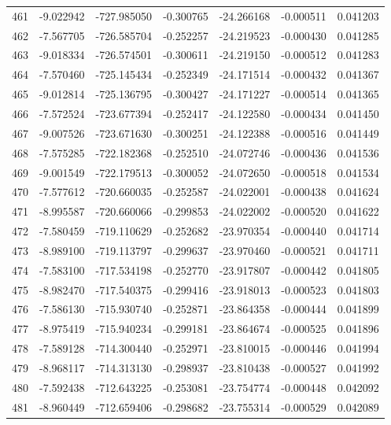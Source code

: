 \begin{tabular}{rrrrrrr}
 461 &  -9.022942 & -727.985050 & -0.300765 &  -24.266168 &   -0.000511 &  0.041203 \\
 462 &  -7.567705 & -726.585704 & -0.252257 &  -24.219523 &   -0.000430 &  0.041285 \\
 463 &  -9.018334 & -726.574501 & -0.300611 &  -24.219150 &   -0.000512 &  0.041283 \\
 464 &  -7.570460 & -725.145434 & -0.252349 &  -24.171514 &   -0.000432 &  0.041367 \\
 465 &  -9.012814 & -725.136795 & -0.300427 &  -24.171227 &   -0.000514 &  0.041365 \\
 466 &  -7.572524 & -723.677394 & -0.252417 &  -24.122580 &   -0.000434 &  0.041450 \\
 467 &  -9.007526 & -723.671630 & -0.300251 &  -24.122388 &   -0.000516 &  0.041449 \\
 468 &  -7.575285 & -722.182368 & -0.252510 &  -24.072746 &   -0.000436 &  0.041536 \\
 469 &  -9.001549 & -722.179513 & -0.300052 &  -24.072650 &   -0.000518 &  0.041534 \\
 470 &  -7.577612 & -720.660035 & -0.252587 &  -24.022001 &   -0.000438 &  0.041624 \\
 471 &  -8.995587 & -720.660066 & -0.299853 &  -24.022002 &   -0.000520 &  0.041622 \\
 472 &  -7.580459 & -719.110629 & -0.252682 &  -23.970354 &   -0.000440 &  0.041714 \\
 473 &  -8.989100 & -719.113797 & -0.299637 &  -23.970460 &   -0.000521 &  0.041711 \\
 474 &  -7.583100 & -717.534198 & -0.252770 &  -23.917807 &   -0.000442 &  0.041805 \\
 475 &  -8.982470 & -717.540375 & -0.299416 &  -23.918013 &   -0.000523 &  0.041803 \\
 476 &  -7.586130 & -715.930740 & -0.252871 &  -23.864358 &   -0.000444 &  0.041899 \\
 477 &  -8.975419 & -715.940234 & -0.299181 &  -23.864674 &   -0.000525 &  0.041896 \\
 478 &  -7.589128 & -714.300440 & -0.252971 &  -23.810015 &   -0.000446 &  0.041994 \\
 479 &  -8.968117 & -714.313130 & -0.298937 &  -23.810438 &   -0.000527 &  0.041992 \\
 480 &  -7.592438 & -712.643225 & -0.253081 &  -23.754774 &   -0.000448 &  0.042092 \\
 481 &  -8.960449 & -712.659406 & -0.298682 &  -23.755314 &   -0.000529 &  0.042089 \\

\end{tabular}
